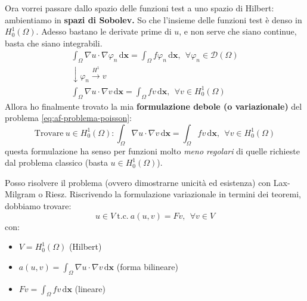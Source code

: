 \documentclass[10pt,a4paper,twoside,openright]{book}
\newcommand{\x}{\mathbf{x}}
\newcommand{\de}{\,\mathrm d}
\newcommand{\dxx}{\de \x}
\begin{document}
Ora vorrei passare dallo spazio delle funzioni test a uno spazio di Hilbert: ambientiamo in \textbf{spazi di Sobolev. }So che l'insieme delle funzioni test è denso in $\displaystyle H_{0}^{1}(\Omega)$. Adesso bastano le derivate prime di $u$, e non serve che siano continue, basta che siano integrabili.
\begin{gather*}
	\int _{\Omega } \nabla u\cdotp \nabla \varphi _{n} \dxx =\int _{\Omega } f\varphi _{n} \dxx ,\ \ \forall \varphi _{n} \in \mathcal{D}(\Omega)\\
	\downarrow \varphi _{n}\xrightarrow{H^{1}} v\\
	\int _{\Omega } \nabla u\cdotp \nabla v\dxx =\int _{\Omega } fv\dxx ,\ \ \forall v\in H_{0}^{1}(\Omega)
\end{gather*}
Allora ho finalmente trovato la mia \textbf{formulazione debole (o variazionale)} del problema \eqref{eq:af-problema-poisson}: 
\begin{equation}
	\boxed{\text{Trovare} \ u\in H_{0}^{1}(\Omega) :\int _{\Omega } \nabla u\cdotp \nabla v\dxx =\int _{\Omega } fv\dxx ,\ \ \forall v\in H_{0}^{1}(\Omega)}
\end{equation}
questa formulazione ha senso per funzioni molto \textit{meno regolari} di quelle richieste dal problema classico (basta $\displaystyle u\in H_{0}^{1}(\Omega)$).

Posso risolvere il problema (ovvero dimostrarne unicità ed esistenza) con Lax-Milgram o Riesz. Riscrivendo la formulazione variazionale in termini dei teoremi, dobbiamo trovare:
\begin{equation*}
	u\in V\ \text{t.c.} \ a(u,v) =Fv,\ \ \forall v\in V
\end{equation*}
con:
\begin{itemize}
	\item $\displaystyle V=H_{0}^{1}(\Omega)$ (Hilbert)
	\item $\displaystyle a(u,v) =\int _{\Omega } \nabla u\cdotp \nabla v\dxx$ (forma bilineare)
	\item $\displaystyle Fv=\int _{\Omega } fv\dxx$ (lineare)
\end{itemize}
\end{document}
